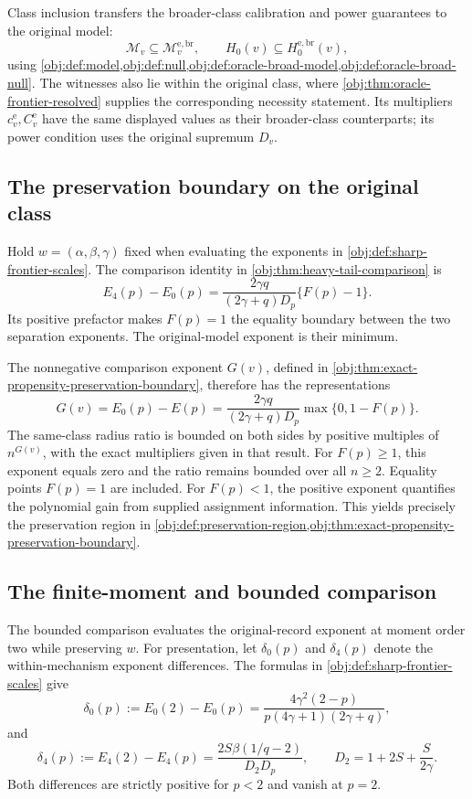 \documentclass[11pt]{article}
\begin{document}
Class inclusion transfers the broader-class calibration and power guarantees to the original model:
\[
\mathcal M_v\subseteq\mathcal M_v^{\mathrm{e,br}},
\qquad
H_0(v)\subseteq H_0^{\mathrm{e,br}}(v),
\]
using \cref{obj:def:model,obj:def:null,obj:def:oracle-broad-model,obj:def:oracle-broad-null}. The witnesses also lie within the original class, where \cref{obj:thm:oracle-frontier-resolved} supplies the corresponding necessity statement. Its multipliers \(c^{\mathrm e}_v,C^{\mathrm e}_v\) have the same displayed values as their broader-class counterparts; its power condition uses the original supremum \(D_v\).

\subsection{The preservation boundary on the original class}

Hold \(w=(\alpha,\beta,\gamma)\) fixed when evaluating the exponents in \cref{obj:def:sharp-frontier-scales}. The comparison identity in \cref{obj:thm:heavy-tail-comparison} is
\[
E_4(p)-E_0(p)
=
\frac{2\gamma q}{(2\gamma+q)D_p}\{F(p)-1\}.
\]
Its positive prefactor makes \(F(p)=1\) the equality boundary between the two separation exponents. The original-model exponent is their minimum.

The nonnegative comparison exponent \(G(v)\), defined in \cref{obj:thm:exact-propensity-preservation-boundary}, therefore has the representations
\[
G(v)=E_0(p)-E(p)
=
\frac{2\gamma q}{(2\gamma+q)D_p}
\max\{0,1-F(p)\}.
\]
The same-class radius ratio is bounded on both sides by positive multiples of \(n^{G(v)}\), with the exact multipliers given in that result. For \(F(p)\ge1\), this exponent equals zero and the ratio remains bounded over all \(n\ge2\). Equality points \(F(p)=1\) are included. For \(F(p)<1\), the positive exponent quantifies the polynomial gain from supplied assignment information. This yields precisely the preservation region in \cref{obj:def:preservation-region,obj:thm:exact-propensity-preservation-boundary}.

\subsection{The finite-moment and bounded comparison}

The bounded comparison evaluates the original-record exponent at moment order two while preserving \(w\). For presentation, let \(\delta_0(p)\) and \(\delta_4(p)\) denote the within-mechanism exponent differences. The formulas in \cref{obj:def:sharp-frontier-scales} give
\[
\delta_0(p)
:=E_0(2)-E_0(p)
=
\frac{4\gamma^2(2-p)}
{p(4\gamma+1)(2\gamma+q)},
\]
and
\[
\delta_4(p)
:=E_4(2)-E_4(p)
=
\frac{2S\beta(1/q-2)}{D_2D_p},
\qquad
D_2=1+2S+\frac{S}{2\gamma}.
\]
Both differences are strictly positive for \(p<2\) and vanish at \(p=2\).
\end{document}
